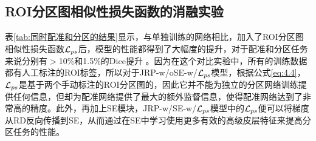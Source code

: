 \subsection{ROI分区图相似性损失函数的消融实验}
表\ref{tab:同时配准和分区的结果}显示，与单独训练的网络相比，加入了ROI分区图相似性损失函数${\cal L}_{ps}$后，模型的性能都得到了大幅度的提升，对于配准和分区任务来说分别有$>$10\%和1.5\%的Dice提升 。因为在这个对比实验中，所有的训练数据都有人工标注的ROI标签，所以对于JRP-w/oSE-w/${\cal L}_{ps}$模型，根据公式\ref{eq:4.4}，${\cal L}_{ps}$是基于两个手动标注的ROI分区图的，因此它并不能为独立的分区网络训练提供任何信息，但却为配准网络提供了最大的额外监督信息，使得配准网络达到了非常高的精度。此外，再加上SE模块，JRP-w/SE-w/${\cal L}_{ps}$模型中的${\cal L}_{ps}$便可以将梯度从RD反向传播到SE，从而通过在SE中学习使用更多有效的高级皮层特征来提高分区任务的性能。


